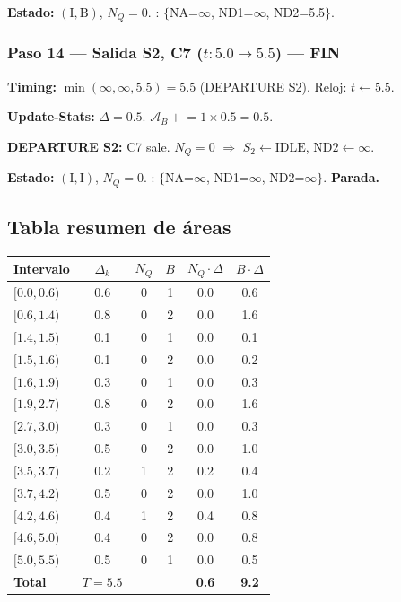\documentclass[11pt, letterpaper]{article}
\begin{document}
\textbf{Estado:} $(\text{I}, \text{B})$, $N_Q = 0$. \quad \FEL: $\{$NA=$\infty$, ND1=$\infty$, ND2=5.5$\}$.

\subsubsection*{Paso 14 --- Salida S2, C7 ($t: 5.0 \to 5.5$) --- FIN}

\textbf{Timing:} $\min(\infty, \infty, 5.5) = 5.5$ (DEPARTURE S2). Reloj: $t \leftarrow 5.5$.

\textbf{Update-Stats:} $\Delta = 0.5$. $\mathcal{A}_B \mathrel{+}= 1 \times 0.5 = 0.5$.

\textbf{DEPARTURE S2:} C7 sale. $N_Q = 0$ $\Rightarrow$ $S_2 \leftarrow \text{IDLE}$, $\text{ND2} \leftarrow \infty$.

\textbf{Estado:} $(\text{I}, \text{I})$, $N_Q = 0$. \quad \FEL: $\{$NA=$\infty$, ND1=$\infty$, ND2=$\infty\}$. \textbf{Parada.}

\subsection{Tabla resumen de áreas}

\begin{center}
\small
\renewcommand{\arraystretch}{1.12}
\begin{tabular}{@{}lccccc@{}}
\toprule
Intervalo & $\Delta_k$ & $N_Q$ & $B$ & $N_Q \cdot \Delta$ & $B \cdot \Delta$ \\
\midrule
$[0.0, 0.6)$ & 0.6 & 0 & 1 & 0.0 & 0.6 \\
$[0.6, 1.4)$ & 0.8 & 0 & 2 & 0.0 & 1.6 \\
$[1.4, 1.5)$ & 0.1 & 0 & 1 & 0.0 & 0.1 \\
$[1.5, 1.6)$ & 0.1 & 0 & 2 & 0.0 & 0.2 \\
$[1.6, 1.9)$ & 0.3 & 0 & 1 & 0.0 & 0.3 \\
$[1.9, 2.7)$ & 0.8 & 0 & 2 & 0.0 & 1.6 \\
$[2.7, 3.0)$ & 0.3 & 0 & 1 & 0.0 & 0.3 \\
$[3.0, 3.5)$ & 0.5 & 0 & 2 & 0.0 & 1.0 \\
\rowcolor{rojoclaro!10}
$[3.5, 3.7)$ & 0.2 & 1 & 2 & 0.2 & 0.4 \\
$[3.7, 4.2)$ & 0.5 & 0 & 2 & 0.0 & 1.0 \\
\rowcolor{rojoclaro!10}
$[4.2, 4.6)$ & 0.4 & 1 & 2 & 0.4 & 0.8 \\
$[4.6, 5.0)$ & 0.4 & 0 & 2 & 0.0 & 0.8 \\
$[5.0, 5.5)$ & 0.5 & 0 & 1 & 0.0 & 0.5 \\
\midrule
\textbf{Total} & $T = 5.5$ & & & \textbf{0.6} & \textbf{9.2} \\
\bottomrule
\end{tabular}
\end{center}
\end{document}

